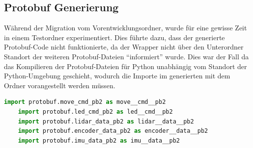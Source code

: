 \subsection{Protobuf Generierung}
Während der Migration vom Vorentwicklungsordner, 
wurde für eine gewisse Zeit in einem Testordner experimentiert.
%
Dies führte dazu, dass der generierte Protobuf-Code nicht funktionierte,
da der Wrapper nicht über den Unterordner Standort  
der weiteren Protobuf-Dateien ``informiert'' wurde.
Dies war der Fall da das Kompilieren der Protobuf-Dateien für Python unabhängig vom Standort
der Python-Umgebung geschieht, 
wodurch die Importe im generierten 
mit dem Ordner vorangestellt werden müssen.

\begin{lstlisting}[language=python, gobble=4]
    import protobuf.move_cmd_pb2 as move__cmd__pb2
    import protobuf.led_cmd_pb2 as led__cmd__pb2
    import protobuf.lidar_data_pb2 as lidar__data__pb2
    import protobuf.encoder_data_pb2 as encoder__data__pb2
    import protobuf.imu_data_pb2 as imu__data__pb2
\end{lstlisting}
